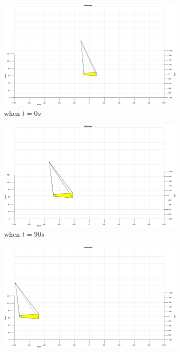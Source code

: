\begin{figure}
	\centering
	\begin{subfigure}[b]{0.32\linewidth}
		\includegraphics[width=\textwidth]{images/chapter4/inertial_UAV_-5mps}
		\caption{when $t=0s$}
	\end{subfigure}
	\begin{subfigure}[b]{0.32\linewidth}
		\includegraphics[width=\textwidth]{images/chapter4/inertial_UAV_-5mps_90s}
		\caption{when $t=90s$}
	\end{subfigure}
	\begin{subfigure}[b]{0.32\linewidth}
		\includegraphics[width=\textwidth]{images/chapter4/inertial_UAV_-5mps_180s}

\end{subfigure}
\end{figure}
